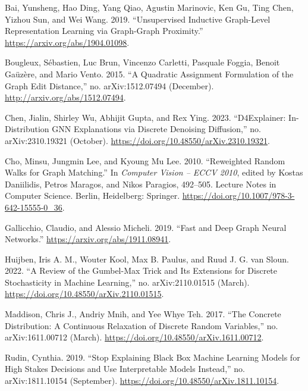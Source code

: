 \documentclass[
  11pt,
  letterpaper,
]{article}
\newlength{\cslhangindent}
\newlength{\cslentryspacingunit} %
\newenvironment{CSLReferences}[2] %
 {%
  \setlength{\parindent}{0pt}
  \ifodd #1
  \let\oldpar\par
  \def\par{\hangindent=\cslhangindent\oldpar}
  \fi
  \setlength{\parskip}{#2\cslentryspacingunit}
 }%
 {}
\begin{document}
\hypertarget{refs}{}
\begin{CSLReferences}{1}{0}
\leavevmode{}%
Bai, Yunsheng, Hao Ding, Yang Qiao, Agustin Marinovic, Ken Gu, Ting
Chen, Yizhou Sun, and Wei Wang. 2019. {``Unsupervised Inductive
Graph-Level Representation Learning via Graph-Graph Proximity.''}
\url{https://arxiv.org/abs/1904.01098}.

\leavevmode{}%
Bougleux, Sébastien, Luc Brun, Vincenzo Carletti, Pasquale Foggia,
Benoit Gaüzère, and Mario Vento. 2015. {``A Quadratic Assignment
Formulation of the Graph Edit Distance,''} no. arXiv:1512.07494
(December). \url{http://arxiv.org/abs/1512.07494}.

\leavevmode{}%
Chen, Jialin, Shirley Wu, Abhijit Gupta, and Rex Ying. 2023.
{``D4Explainer: In-Distribution GNN Explanations via Discrete Denoising
Diffusion,''} no. arXiv:2310.19321 (October).
\url{https://doi.org/10.48550/arXiv.2310.19321}.

\leavevmode{}%
Cho, Minsu, Jungmin Lee, and Kyoung Mu Lee. 2010. {``Reweighted Random
Walks for Graph Matching.''} In \emph{Computer Vision -- ECCV 2010},
edited by Kostas Daniilidis, Petros Maragos, and Nikos Paragios,
492--505. Lecture Notes in Computer Science. Berlin, Heidelberg:
Springer. \url{https://doi.org/10.1007/978-3-642-15555-0_36}.

\leavevmode{}%
Gallicchio, Claudio, and Alessio Micheli. 2019. {``Fast and Deep Graph
Neural Networks.''} \url{https://arxiv.org/abs/1911.08941}.

\leavevmode{}%
Huijben, Iris A. M., Wouter Kool, Max B. Paulus, and Ruud J. G. van
Sloun. 2022. {``A Review of the Gumbel-Max Trick and Its Extensions for
Discrete Stochasticity in Machine Learning,''} no. arXiv:2110.01515
(March). \url{https://doi.org/10.48550/arXiv.2110.01515}.

\leavevmode{}%
Maddison, Chris J., Andriy Mnih, and Yee Whye Teh. 2017. {``The Concrete
Distribution: A Continuous Relaxation of Discrete Random Variables,''}
no. arXiv:1611.00712 (March).
\url{https://doi.org/10.48550/arXiv.1611.00712}.

\leavevmode{}%
Rudin, Cynthia. 2019. {``Stop Explaining Black Box Machine Learning
Models for High Stakes Decisions and Use Interpretable Models
Instead,''} no. arXiv:1811.10154 (September).
\url{https://doi.org/10.48550/arXiv.1811.10154}.


\end{CSLReferences}
\end{document}
